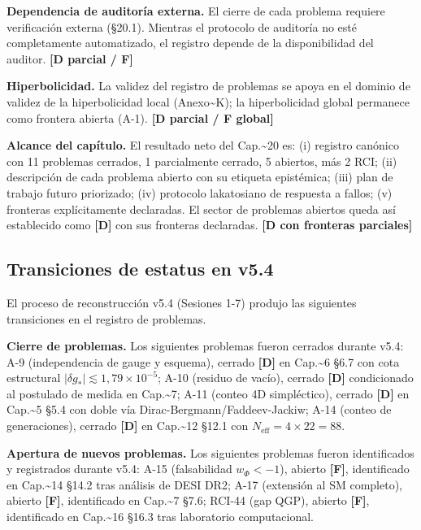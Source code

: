 ﻿\documentclass[11pt,letterpaper]{article}
\begin{document}
\textbf{Dependencia de auditoría externa.} El cierre de cada problema requiere verificación externa (§20.1). Mientras el protocolo de auditoría no esté completamente automatizado, el registro depende de la disponibilidad del auditor. \textbf{[D parcial / F]}

\textbf{Hiperbolicidad.} La validez del registro de problemas se apoya en el dominio de validez de la hiperbolicidad local (Anexo\textasciitilde{}K); la hiperbolicidad global permanece como frontera abierta (A-1). \textbf{[D parcial / F global]}

\textbf{Alcance del capítulo.} El resultado neto del Cap.\textasciitilde{}20 es: (i) registro canónico con 11 problemas cerrados, 1 parcialmente cerrado, 5 abiertos, más 2 RCI; (ii) descripción de cada problema abierto con su etiqueta epistémica; (iii) plan de trabajo futuro priorizado; (iv) protocolo lakatosiano de respuesta a fallos; (v) fronteras explícitamente declaradas. El sector de problemas abiertos queda así establecido como \textbf{[D]} con sus fronteras declaradas. \textbf{[D con fronteras parciales]}
\subsection{Transiciones de estatus en v5.4}
El proceso de reconstrucción v5.4 (Sesiones 1-7) produjo las siguientes transiciones en el registro de problemas.

\textbf{Cierre de problemas.} Los siguientes problemas fueron cerrados durante v5.4: A-9 (independencia de gauge y esquema), cerrado \textbf{[D]} en Cap.\textasciitilde{}6 §6.7 con cota estructural $|\delta g_*| \lesssim 1{,}79 \times 10^{-5}$; A-10 (residuo de vacío), cerrado \textbf{[D]} condicionado al postulado de medida en Cap.\textasciitilde{}7; A-11 (conteo 4D simpléctico), cerrado \textbf{[D]} en Cap.\textasciitilde{}5 §5.4 con doble vía Dirac-Bergmann/Faddeev-Jackiw; A-14 (conteo de generaciones), cerrado \textbf{[D]} en Cap.\textasciitilde{}12 §12.1 con $N_{\text{eff}} = 4 \times 22 = 88$.

\textbf{Apertura de nuevos problemas.} Los siguientes problemas fueron identificados y registrados durante v5.4: A-15 (falsabilidad $w_\Phi < -1$), abierto \textbf{[F]}, identificado en Cap.\textasciitilde{}14 §14.2 tras análisis de DESI DR2; A-17 (extensión al SM completo), abierto \textbf{[F]}, identificado en Cap.\textasciitilde{}7 §7.6; RCI-44 (gap QGP), abierto \textbf{[F]}, identificado en Cap.\textasciitilde{}16 §16.3 tras laboratorio computacional.
\end{document}
